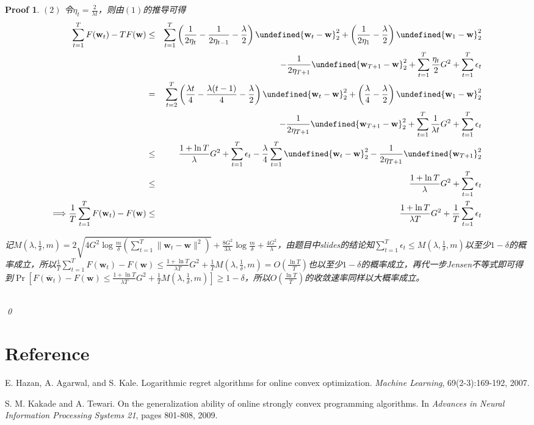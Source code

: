 \documentclass[a4paper,UTF8]{article}
\let\norm\undefined %
\DeclarePairedDelimiter\norm{\lVert}{\rVert}
\numberwithin{equation}{section}
\newtheorem*{myProof}{Proof}
\begin{document}
\begin{myProof}
$(2)$ 令$\eta_t = \frac{2}{\lambda t}$，则由$(1)$的推导可得
\begin{eqnarray*}
\sum_{t=1}^T F(\mathbf{w}_t) - TF(\mathbf{w}) &\le& \sum_{t=1}^T \left( \frac{1}{2\eta_t} - \frac{1}{2\eta_{t-1}} - \frac{\lambda}{2} \right) \norm{\mathbf{w}_t - \mathbf{w}}_2^2 + \left( \frac{1}{2\eta_1} - \frac{\lambda}{2} \right) \norm{\mathbf{w}_1 - \mathbf{w}}_2^2 \\
&& - \frac{1}{2\eta_{T+1}}\norm{\mathbf{w}_{T+1} - \mathbf{w}}_2^2 + \sum_{t=1}^T \frac{\eta_t}{2} G^2 + \sum_{t=1}^T \epsilon_t \\
&=& \sum_{t=2}^T \left( \frac{\lambda t}{4} - \frac{\lambda (t-1)}{4} - \frac{\lambda}{2} \right) \norm{\mathbf{w}_t - \mathbf{w}}_2^2 + \left( \frac{\lambda}{4} - \frac{\lambda}{2} \right) \norm{\mathbf{w}_1 - \mathbf{w}}_2^2 \\
&& - \frac{1}{2\eta_{T+1}}\norm{\mathbf{w}_{T+1} - \mathbf{w}}_2^2 + \sum_{t=1}^T \frac{1}{\lambda t} G^2 + \sum_{t=1}^T \epsilon_t \\
&\le& \frac{1 + \ln T}{\lambda}G^2 + \sum_{t=1}^T \epsilon_t - \frac{\lambda}{4} \sum_{t=1}^T \norm{\mathbf{w}_t - \mathbf{w}}_2^2 - \frac{1}{2\eta_{T+1}}\norm{\mathbf{w}_{T+1}}_2^2 \\
&\le& \frac{1 + \ln T}{\lambda}G^2 + \sum_{t=1}^T \epsilon_t \\
\Longrightarrow \frac{1}{T}\sum_{t=1}^T F(\mathbf{w}_t) - F(\mathbf{w}) &\le& \frac{1 + \ln T}{\lambda T}G^2 + \frac{1}{T}\sum_{t=1}^T \epsilon_t
\end{eqnarray*}

记$M(\lambda, \frac{1}{\delta}, m) = 2\sqrt{ 4 G^2  \log \frac{m }{\delta} \left( \sum_{t=1}^T \|\mathbf{w}_t - \mathbf{w}\|^2\right)} +  \frac{8G^2}{3\lambda}   \log \frac{m }{\delta} + \frac{4G^2}{\lambda}$，由题目中slides的结论知$\sum_{t=1}^T \epsilon_t \le M(\lambda, \frac{1}{\delta}, m)$以至少$1-\delta$的概率成立，所以$\frac{1}{T}\sum_{t=1}^T F(\mathbf{w}_t) - F(\mathbf{w}) \le \frac{1 + \ln T}{\lambda T}G^2 + \frac{1}{T} M(\lambda, \frac{1}{\delta}, m) = O(\frac{\ln T}{T})$也以至少$1-\delta$的概率成立，再代一步Jensen不等式即可得到$\Pr [ F(\overline{\mathbf{w}}_t) - F(\mathbf{w}) \le \frac{1 + \ln T}{\lambda T}G^2 + \frac{1}{T} M(\lambda, \frac{1}{\delta}, m)] \ge 1 - \delta$，所以$O(\frac{\ln T}{T})$的收敛速率同样以大概率成立。

	~\\	
	\qed
\end{myProof}
\newpage
\section*{Reference}
\begin{enumerate}[ {[}1{]}]
\item E. Hazan, A. Agarwal, and S. Kale. Logarithmic regret algorithms for online convex optimization. \textit{Machine Learning}, 69(2-3):169-192, 2007.
\item S. M. Kakade and A. Tewari. On the generalization ability of online strongly convex programming algorithms. In \textit{Advances in Neural Information Processing Systems 21}, pages 801-808, 2009.
\end{enumerate}
\end{document}

